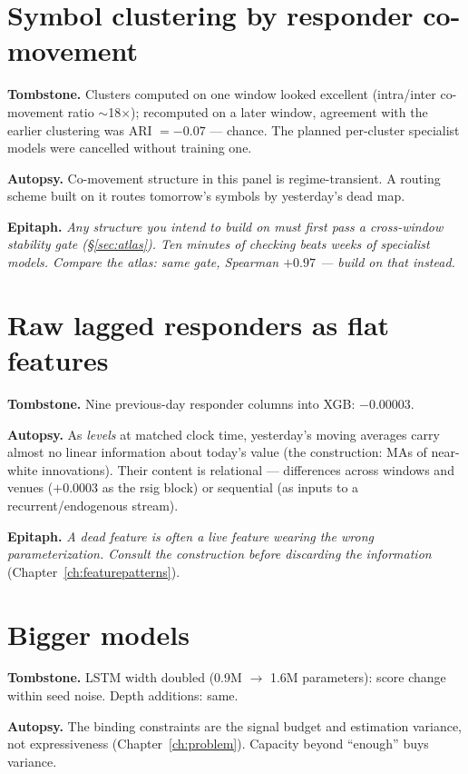\section{Symbol clustering by responder co-movement}

\textbf{Tombstone.} Clusters computed on one window looked excellent
(intra/inter co-movement ratio $\sim$18$\times$); recomputed on a later
window, agreement with the earlier clustering was ARI $= -0.07$ ---
chance. The planned per-cluster specialist models were cancelled without
training one.

\textbf{Autopsy.} Co-movement structure in this panel is
regime-transient. A routing scheme built on it routes tomorrow's symbols
by yesterday's dead map.

\textbf{Epitaph.} \emph{Any structure you intend to build on must first
pass a cross-window stability gate (\S\ref{sec:atlas}). Ten minutes of
checking beats weeks of specialist models. Compare the atlas: same gate,
Spearman $+0.97$ --- build on that instead.}

\section{Raw lagged responders as flat features}

\textbf{Tombstone.} Nine previous-day responder columns into XGB:
$-0.00003$.

\textbf{Autopsy.} As \emph{levels} at matched clock time, yesterday's
moving averages carry almost no linear information about today's value
(the construction: MAs of near-white innovations). Their content is
relational --- differences across windows and venues ($+0.0003$ as the
rsig block) or sequential (as inputs to a recurrent/endogenous stream).

\textbf{Epitaph.} \emph{A dead feature is often a live feature wearing
the wrong parameterization. Consult the construction before discarding
the information} (Chapter~\ref{ch:featurepatterns}).

\section{Bigger models}

\textbf{Tombstone.} LSTM width doubled (0.9M $\to$ 1.6M parameters):
score change within seed noise. Depth additions: same.

\textbf{Autopsy.} The binding constraints are the signal budget and
estimation variance, not expressiveness
(Chapter~\ref{ch:problem}). Capacity beyond ``enough'' buys variance.

